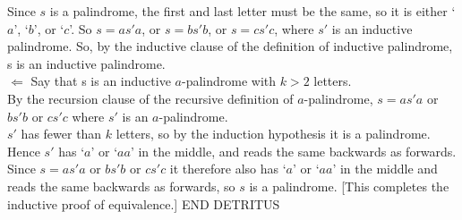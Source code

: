 \documentclass[12pt]{article}
\newcommand{\detritus}[1]{}
\begin{document}
\begin{enumerate}
{Since $s$ is a palindrome, the first and last letter must be the same, so it is either 
`$a$', `$b$', or `$c$'. So $s = as'a$, or $s = bs'b$, or $s = cs'c$, where
$s'$ is an inductive palindrome. So, by the inductive clause of the definition of 
inductive palindrome, s is an inductive palindrome.\\

$\Leftarrow$ Say that s is an inductive $a$-palindrome with $k>2$ letters. \\
By the recursion clause of the recursive definition of $a$-palindrome, $s = as'a$ or $bs'b$ or $cs'c$ where $s'$ is an $a$-palindrome.\\
$s'$ has fewer than $k$ letters, so by the induction hypothesis it is a palindrome. \\
Hence $s'$ has `$a$' or `$aa$' in the middle, and reads the same backwards as forwards.\\
Since $s = as'a$ or $bs'b$ or $cs'c$ it therefore also has `$a$' or `$aa$' in the middle and reads the same backwards as forwards,
so $s$ is a palindrome.
[This completes the inductive proof of equivalence.] END DETRITUS}

\detritus{CHESSBOARD QUESTION SOLUTION
\item (Show by induction that a $2^n$ x $2^n$ chessboard with one square covered can be covered by L-tiles
without overlap.)

\noindent {\bf{Base case}}: Say that n=2. This is immediate, since whatever
square is omitted, there will be an L-shape left over, as in this case (chosen square in red, remainder
in blue): 
\begin{pspicture}(0,0)(1.5,1.5) 
\pspolygon[fillstyle=solid, fillcolor=blue](.2,.2)(.7,.2)(.7,.7)(1.2,.7)(1.2,1.2)(.2,1.2)
\pspolygon[fillstyle=solid, fillcolor=red](.7,.2)(.7,.7)(1.2,.7)(1.2,.2)
\end{pspicture}

\medskip

\noindent {\bf{Induction step}}: {\bf{Assume}} (induction hypothesis) that any $2^n$ x $2^n$ board with one square removed
can be covered without overlap with L-tiles. We want to show that any $2^{n+1}$ x $2^{n+1}$ board with 
one square removed
can be covered without overlap with L-tiles.\\

\noindent Proof of induction step:\\

Given a $2^{n+1}$ x $2^{n+1}$ board with 
one square removed, break it into four $2^n$ x $2^n$ chessboards as in the diagram: 

}
\end{enumerate}
\end{document}
